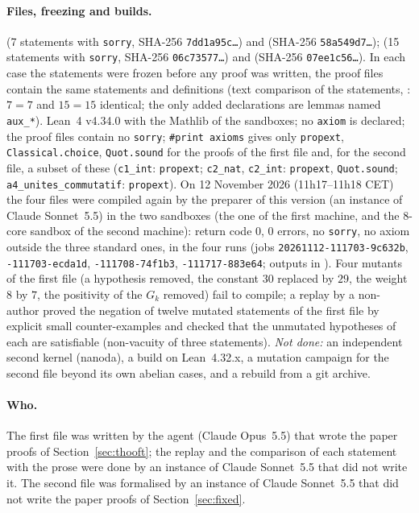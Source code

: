 \documentclass[11pt,a4paper]{article}
\theoremstyle{plain}
\theoremstyle{definition}
\theoremstyle{remark}
\numberwithin{equation}{section}
\begin{document}
\paragraph{Files, freezing and builds.}  (7 statements with \texttt{sorry}, SHA-256 \texttt{7dd1a95c\dots}) and  (SHA-256 \texttt{58a549d7\dots});  (15 statements with \texttt{sorry}, SHA-256 \texttt{06c73577\dots}) and  (SHA-256 \texttt{07ee1c56\dots}). In each case the statements were frozen before any proof was written, the proof files contain the same statements and definitions (text comparison of the statements, : $7=7$ and $15=15$ identical; the only added declarations are lemmas named \texttt{aux\_*}). Lean~4 v4.34.0 with the Mathlib of the sandboxes; no \texttt{axiom} is declared; the proof files contain no \texttt{sorry}; \texttt{\#print axioms} gives only \texttt{propext}, \texttt{Classical.choice}, \texttt{Quot.sound} for the proofs of the first file and, for the second file, a subset of these (\texttt{c1\_int}: \texttt{propext}; \texttt{c2\_nat}, \texttt{c2\_int}: \texttt{propext}, \texttt{Quot.sound}; \texttt{a4\_unites\_commutatif}: \texttt{propext}). On 12 November 2026 (11h17--11h18 CET) the four files were compiled again by the preparer of this version (an instance of Claude Sonnet~5.5) in the two sandboxes (the one of the first machine, and the 8-core sandbox of the second machine): return code $0$, $0$ errors, no \texttt{sorry}, no axiom outside the three standard ones, in the four runs (jobs \texttt{20261112-111703-9c632b}, \texttt{-111703-ecda1d}, \texttt{-111708-74f1b3}, \texttt{-111717-883e64}; outputs in ). Four mutants of the first file (a hypothesis removed, the constant $30$ replaced by $29$, the weight $8$ by $7$, the positivity of the $G_k$ removed) fail to compile; a replay by a non-author proved the negation of twelve mutated statements of the first file by explicit small counter-examples and checked that the unmutated hypotheses of each are satisfiable (non-vacuity of three statements). \emph{Not done:} an independent second kernel (nanoda), a build on Lean~4.32.x, a mutation campaign for the second file beyond its own abelian cases, and a rebuild from a git archive.

\paragraph{Who.} The first file was written by the agent (Claude Opus~5.5) that wrote the paper proofs of Section~\ref{sec:thooft}; the replay and the comparison of each statement with the prose were done by an instance of Claude Sonnet~5.5 that did not write it. The second file was formalised by an instance of Claude Sonnet~5.5 that did not write the paper proofs of Section~\ref{sec:fixed}.
\end{document}
